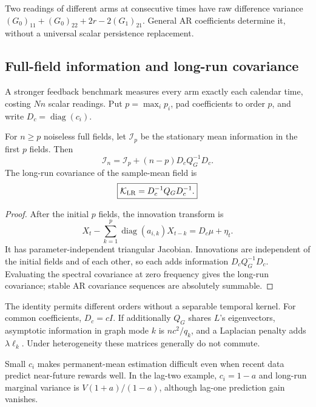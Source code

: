 Two readings of different arms at consecutive times have raw difference variance $(G_0)_{11}+(G_0)_{22}+2r-2(G_1)_{21}$. General AR coefficients determine it, without a universal scalar persistence replacement.

\subsection{Full-field information and long-run covariance}
A stronger feedback benchmark measures every arm exactly each calendar time, costing $Nn$ scalar readings. Put $p=\max_i p_i$, pad coefficients to order $p$, and write $D_c=\operatorname{diag}(c_i)$.

\begin{proposition}
For $n\ge p$ noiseless full fields, let $\mathcal I_p$ be the stationary mean information in the first $p$ fields. Then
\begin{equation}
\boxed{\mathcal I_n=\mathcal I_p+(n-p)D_cQ_G^{-1}D_c.}
\label{spatiotemporal_bandits:eq:full-field}
\end{equation}
The long-run covariance of the sample-mean field is
\begin{equation}
\boxed{\mathcal K_{\rm LR}=D_c^{-1}Q_GD_c^{-1}.}
\label{spatiotemporal_bandits:eq:long-run}
\end{equation}
\end{proposition}
\begin{proof}
After the initial $p$ fields, the innovation transform is
\[
X_t-\sum_{k=1}^p\operatorname{diag}(a_{i,k})X_{t-k}=D_c\mu+\eta_t.
\]
It has parameter-independent triangular Jacobian. Innovations are independent of the initial fields and of each other, so each adds information $D_cQ_G^{-1}D_c$. Evaluating the spectral covariance at zero frequency gives the long-run covariance; stable AR covariance sequences are absolutely summable.
\end{proof}

The identity permits different orders without a separable temporal kernel. For common coefficients, $D_c=cI$. If additionally $Q_G$ shares $L$'s eigenvectors, asymptotic information in graph mode $k$ is $nc^2/q_k$, and a Laplacian penalty adds $\lambda\ell_k$. Under heterogeneity these matrices generally do not commute.

Small $c_i$ makes permanent-mean estimation difficult even when recent data predict near-future rewards well. In the lag-two example, $c_i=1-a$ and long-run marginal variance is $V(1+a)/(1-a)$, although lag-one prediction gain vanishes.


